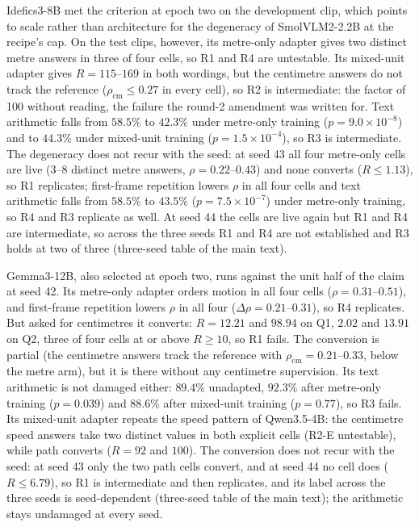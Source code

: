 \documentclass[11pt]{article}
\begin{document}
Idefics3-8B met the criterion at epoch two on the development clip, which
points to scale rather than architecture for the degeneracy of SmolVLM2-2.2B at
the recipe's cap. On the test clips, however, its metre-only adapter gives two
distinct metre answers in three of four cells, so R1 and R4 are untestable. Its
mixed-unit adapter gives $R=115$--$169$ in both wordings, but the centimetre
answers do not track the reference ($\rho_{\mathrm{cm}}\le0.27$ in every cell),
so R2 is intermediate: the factor of 100 without reading, the failure the
round-2 amendment was written for. Text arithmetic falls from $58.5\%$ to
$42.3\%$ under metre-only training ($p=9.0\times10^{-8}$) and to $44.3\%$ under
mixed-unit training ($p=1.5\times10^{-4}$), so R3 is intermediate. The
degeneracy does not recur with the seed: at seed 43 all four metre-only cells
are live (3--8 distinct metre answers, $\rho=0.22$--$0.43$) and none converts
($R\le1.13$), so R1 replicates; first-frame repetition lowers $\rho$ in all four
cells and text arithmetic falls from $58.5\%$ to $43.5\%$
($p=7.5\times10^{-7}$) under metre-only training, so R4 and R3 replicate as
well. At seed 44 the cells are live again but R1 and R4 are intermediate, so
across the three seeds R1 and R4 are not established and R3 holds at two of
three (three-seed table of the main text).

Gemma3-12B, also selected at epoch two, runs against the unit half of the
claim at seed 42. Its metre-only adapter orders motion in all four cells
($\rho=0.31$--$0.51$), and first-frame repetition lowers $\rho$ in all four
($\Delta\rho=0.21$--$0.31$), so R4 replicates. But asked for centimetres it
converts: $R=12.21$ and $98.94$ on Q1, $2.02$ and $13.91$ on Q2, three of four
cells at or above $R\ge10$, so R1 fails. The conversion is partial (the
centimetre answers track the reference with $\rho_{\mathrm{cm}}=0.21$--$0.33$,
below the metre arm), but it is there without any centimetre supervision.
Its text arithmetic is not damaged either:
$89.4\%$ unadapted, $92.3\%$ after metre-only training ($p=0.039$) and $88.6\%$
after mixed-unit training ($p=0.77$), so R3 fails. Its mixed-unit adapter
repeats the speed pattern of Qwen3.5-4B: the centimetre speed answers take two
distinct values in both explicit cells (R2-E untestable), while path converts
($R=92$ and $100$). The conversion does not recur with the seed: at seed 43
only the two path cells convert, and at seed 44 no cell does ($R\le6.79$), so
R1 is intermediate and then replicates, and its label across the three seeds
is seed-dependent (three-seed table of the main text); the arithmetic stays undamaged at every
seed.
\end{document}
